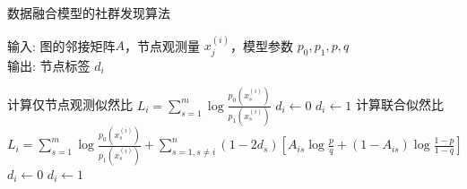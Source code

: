 \documentclass{article}
\begin{document}
\begin{algorithm}
	\caption{数据融合模型的社群发现算法}
		输入: 图的邻接矩阵$A$，节点观测量 $x^{(i)}_{j}$，模型参数 $p_0, p_1, p, q$ \\
		输出: 节点标签 $d_i$
	\begin{algorithmic}
		\STATE 计算仅节点观测似然比 $L_i = \sum_{s=1}^m \log\frac{p_0(x^{(i)}_s)}{p_1(x^{(i)}_s)}$ %
		\STATE $d_i \leftarrow 0$
		\ELSE
		\STATE $d_i \leftarrow 1$
		\ENDIF
		\ENDFOR
		\STATE  计算联合似然比 $L_i = \sum_{s=1}^m \log\frac{p_0(x^{(i)}_s)}{p_1(x^{(i)}_s)} + \sum_{s=1, s\neq i}^n
		(1-2d_s)[A_{is}\log\frac{p}{q} + (1-A_{is})\log\frac{1-p}{1-q}]$ %
		\STATE $d_i \leftarrow 0$
		\ELSE
		\STATE $d_i \leftarrow 1$
		\ENDIF
		\ENDFOR
		\ENDWHILE
	\end{algorithmic}
\end{algorithm}
\end{document}
